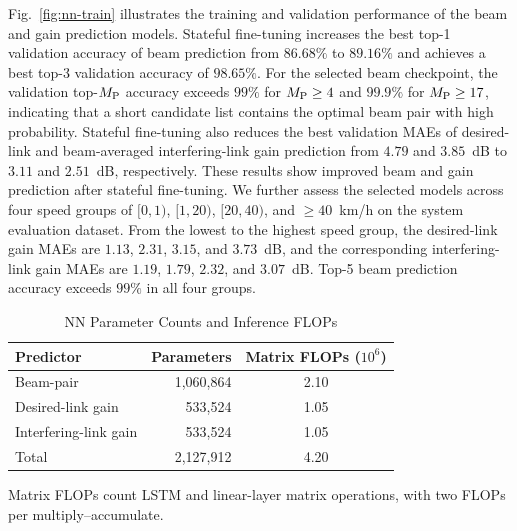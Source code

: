 \documentclass[10pt,journal,letterpaper]{IEEEtran}
\newcommand{\rev}[1]{\textcolor{revisioncolor}{{}#1}}
\newcommand{\omitted}[1]{}
\theoremstyle{remark}
\begin{document}
Fig.~\ref{fig:nn-train} illustrates the training and validation performance of the beam and gain prediction models.
\omitted{}\rev{Stateful fine-tuning increases the best top-1 validation accuracy of beam prediction from $86.68\%$ to $89.16\%$ and achieves a best top-3 validation accuracy of $98.65\%$.}
\omitted{}\rev{For the selected beam checkpoint, the validation top-$M_{\rm P}$ accuracy exceeds $99\%$ for $M_{\rm P} \geq 4$ and $99.9\%$ for $M_{\rm P} \geq 17$, indicating that a short candidate list contains the optimal beam pair with high probability.}
\omitted{}\rev{Stateful fine-tuning also reduces the best validation MAEs of desired-link and \rev{beam-averaged }interfering-link gain prediction from $4.79$ and \rev{$3.85$}~dB to $3.11$ and \rev{$2.51$}~dB, respectively.}
\omitted{}\rev{These results show improved beam and gain prediction after stateful fine-tuning.} \rev{We further assess the selected models across four speed groups of $[0,1)$, $[1,20)$, $[20,40)$, and $\geq40$~km/h on the system evaluation dataset.
From the lowest to the highest speed group, the desired-link gain MAEs are $1.13$, $2.31$, $3.15$, and $3.73$~dB, and the corresponding interfering-link gain MAEs are $1.19$, $1.79$, $2.32$, and $3.07$~dB. Top-5 beam prediction accuracy exceeds $99\%$ in all four groups.}

\begin{table}[tbp]
    \centering
    \color{revisioncolor}
    \caption{NN Parameter Counts and Inference FLOPs}
    \label{tab:nn-overhead}
    \small
    \begin{tabular}{lrc}
        \toprule
        Predictor & Parameters & {Matrix FLOPs ($10^6$)} \\
        \midrule
        Beam-pair & 1,060,864 & 2.10 \\
        Desired-link gain & 533,524 & 1.05 \\
        Interfering-link gain & 533,524 & 1.05 \\
        Total & 2,127,912 & 4.20 \\
        \bottomrule
    \end{tabular}
    \par\smallskip
    \parbox{\columnwidth}{\footnotesize Matrix FLOPs count LSTM and linear-layer matrix operations, with two FLOPs per multiply--accumulate.}
\end{table}
\end{document}
